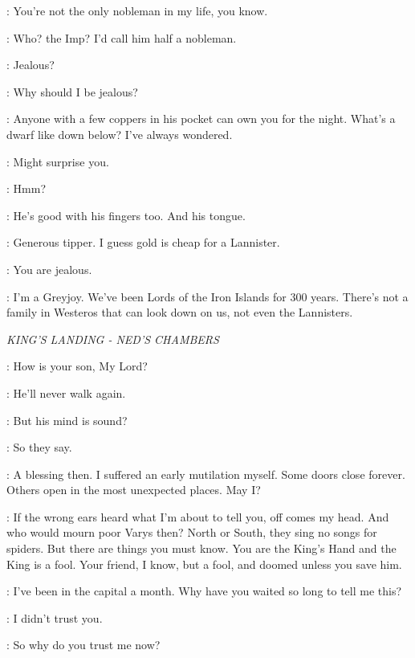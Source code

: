 \ROS: You're not the only nobleman in my life, you know. 

\THEON: Who? the Imp? I'd call him half a nobleman. 

\ROS: Jealous? 

\THEON: Why should I be jealous? 


\THEON: Anyone with a few coppers in his pocket can own you for the night. What's a dwarf like down below? I've always wondered. 

\ROS: Might surprise you. 

\THEON: Hmm? 

\ROS: He's good with his fingers too. And his tongue. 

\THEON: Generous tipper. I guess gold is cheap for a Lannister. 

\ROS: You are jealous. 

\THEON: I'm a Greyjoy. We've been Lords of the Iron Islands for 300 years. There's not a family in Westeros that can look down on us, not even the Lannisters. 


\scene

\textit{KING'S LANDING - NED'S CHAMBERS} 


\VARYS: How is your son, My Lord? 

\NED: He'll never walk again. 

\VARYS: But his mind is sound? 

\NED: So they say. 

\VARYS: A blessing then. I suffered an early mutilation myself. Some doors close forever.  Others open in the most unexpected places.  May I? 

\VARYS: If the wrong ears heard what I'm about to tell you, off comes my head. And who would mourn poor Varys then? North or South, they sing no songs for spiders. But there are things you must know. You are the King's Hand and the King is a fool. Your friend, I know, but a fool, and doomed unless you save him. 

\NED: I've been in the capital a month. Why have you waited so long to tell me this? 

\VARYS: I didn't trust you. 

\NED: So why do you trust me now? 


